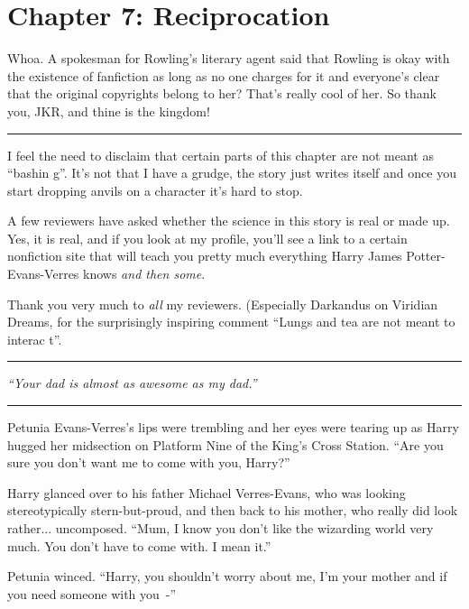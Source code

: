 \chapter{Chapter 7: Reciprocation}
Whoa. A spokesman for Rowling's literary agent said that Rowling is okay with the existence of fanfiction as long as no one charges for it and everyone's clear that the original copyrights belong to her? That's really cool of her. So thank you, JKR, and thine is the kingdom!

\begin{center}\rule{3in}{0.4pt}\end{center}

I feel the need to disclaim that certain parts of this chapter are not meant as ``bashin g''. It's not that I have a grudge, the story just writes itself and once you start dropping anvils on a character it's hard to stop.

A few reviewers have asked whether the science in this story is real or made up. Yes, it is real, and if you look at my profile, you'll see a link to a certain nonfiction site that will teach you pretty much everything Harry James Potter-Evans-Verres knows \emph{and then some}.

Thank you very much to \emph{all} my reviewers. (Especially Darkandus on Viridian Dreams, for the surprisingly inspiring comment ``Lungs and tea are not meant to interac t''.

\begin{center}\rule{3in}{0.4pt}\end{center}

\emph{``Your dad is almost as awesome as my dad.''}

\begin{center}\rule{3in}{0.4pt}\end{center}

Petunia Evans-Verres's lips were trembling and her eyes were tearing up as Harry hugged her midsection on Platform Nine of the King's Cross Station. ``Are you sure you don't want me to come with you, Harry?''

Harry glanced over to his father Michael Verres-Evans, who was looking stereotypically stern-but-proud, and then back to his mother, who really did look rather... uncomposed. ``Mum, I know you don't like the wizarding world very much. You don't have to come with. I mean it.''

Petunia winced. ``Harry, you shouldn't worry about me, I'm your mother and if you need someone with you~-''

